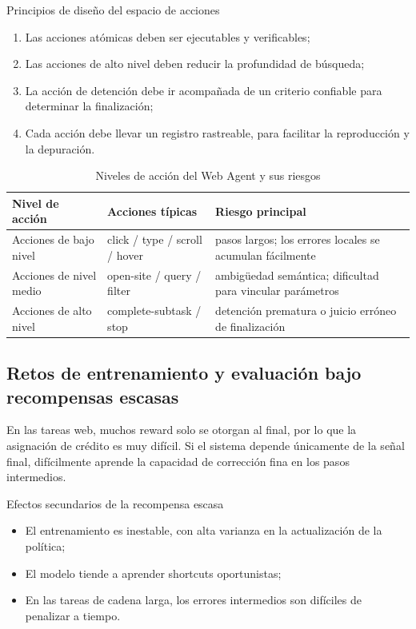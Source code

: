 \begin{importantbox}{Principios de diseño del espacio de acciones}
\begin{enumerate}
    \item Las acciones atómicas deben ser ejecutables y verificables;
    \item Las acciones de alto nivel deben reducir la profundidad de búsqueda;
    \item La acción de detención debe ir acompañada de un criterio confiable para determinar la finalización;
    \item Cada acción debe llevar un registro rastreable, para facilitar la reproducción y la depuración.
\end{enumerate}
\end{importantbox}

\begin{table}[H]
\centering
\small
\begin{tabular}{p{3.2cm}p{4.1cm}p{3.7cm}}
\toprule
\textbf{Nivel de acción} & \textbf{Acciones típicas} & \textbf{Riesgo principal} \\
\midrule
Acciones de bajo nivel & click / type / scroll / hover & pasos largos; los errores locales se acumulan fácilmente \\
Acciones de nivel medio & open-site / query / filter & ambigüedad semántica; dificultad para vincular parámetros \\
Acciones de alto nivel & complete-subtask / stop & detención prematura o juicio erróneo de finalización \\
\bottomrule
\end{tabular}
\caption{Niveles de acción del Web Agent y sus riesgos}
\end{table}

\subsection{Retos de entrenamiento y evaluación bajo recompensas escasas}
En las tareas web, muchos reward solo se otorgan al final, por lo que la asignación de crédito es muy difícil. Si el sistema depende únicamente de la señal final, difícilmente aprende la capacidad de corrección fina en los pasos intermedios.

\begin{warningbox}{Efectos secundarios de la recompensa escasa}
\begin{itemize}
    \item El entrenamiento es inestable, con alta varianza en la actualización de la política;
    \item El modelo tiende a aprender shortcuts oportunistas;
    \item En las tareas de cadena larga, los errores intermedios son difíciles de penalizar a tiempo.
\end{itemize}
\end{warningbox}

